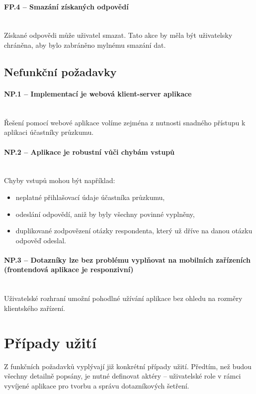 \paragraph{FP.4 – Smazání získaných odpovědí}~\\
Získané odpovědi může uživatel smazat. Tato akce by měla být uživatelsky chráněna, aby bylo zabráněno mylnému smazání dat.

\subsection{Nefunkční požadavky}

\paragraph{NP.1 – Implementací je webová klient-server aplikace}~\\
Řešení pomocí webové aplikace volíme zejména z nutnosti snadného přístupu k aplikaci účastníky průzkumu.

\paragraph{NP.2 – Aplikace je robustní vůči chybám vstupů}~\\
Chyby vstupů mohou být například:
\begin{itemize}
    \item neplatné přihlašovací údaje účastníka průzkumu,
    \item odeslání odpovědí, aniž by byly všechny povinné vyplněny,
    \item duplikované zodpovězení otázky respondenta, který už dříve na danou otázku odpověď odeslal.
\end{itemize}

\paragraph{NP.3 – Dotazníky lze bez problému vyplňovat na mobilních zařízeních (frontendová aplikace je responzivní)
}~\\
Uživatelské rozhraní umožní pohodlné užívání aplikace bez ohledu na rozměry klientského zařízení.

\section{Případy užití}
\label{subsection:usecases}
Z funkčních požadavků vyplývají již konkrétní případy užití. Předtím, než budou všechny detailně popsány, je nutné definovat aktéry – uživatelské role v rámci vyvíjené aplikace pro tvorbu a správu dotazníkových šetření.

